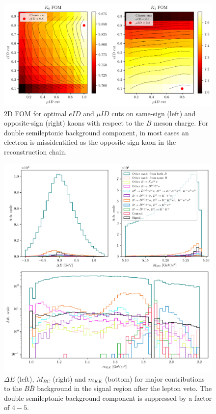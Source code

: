 \begin{figure}[H]
	\centering
	\captionsetup{width=0.8\linewidth}
	\includegraphics[width=\linewidth]{fig/lepVeto}
	\caption{2D FOM for optimal $eID$ and $\mu ID$ cuts on same-sign (left) and opposite-sign (right) kaons with respect to the $B$ meson charge. For double semileptonic background component, in most cases an electron is missidentified as the opposite-sign kaon in the reconstruction chain.}
	\label{fig:lepVeto}
\end{figure} 

\begin{figure}[H]
	\centering
	\captionsetup{width=0.8\linewidth}
	\includegraphics[width=\linewidth]{fig/sig_BKG_composition_all_after}
	\caption{$\Delta E$ (left), $M_{BC}$ (right) and $m_{KK}$ (bottom) for major contributions to the $B \bar B$ background in the signal region after the lepton veto. The double semileptonic background component is suppressed by a factor of $4-5$.}
	\label{fig:sig_bkg_all_after}
\end{figure} 

